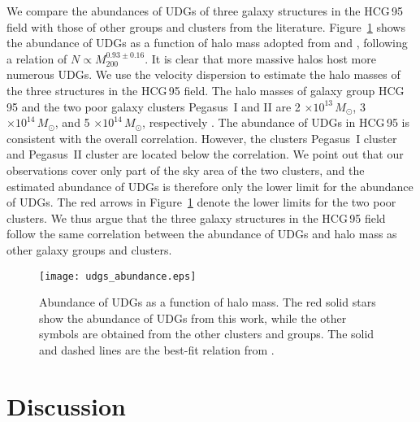 \documentclass[twocolumn,trackchanges]{aastex61}
\begin{document}
We compare the abundances of UDGs of three galaxy structures in the HCG\,95 field with those of other groups and clusters from the literature. Figure~\ref{fig:fig10} shows the abundance of UDGs as a function of halo mass adopted from \cite{Janssens2017} and \cite{vanderBurg2016}, following a relation of $ N \propto M^{0.93\pm0.16}_{200}$. It is clear that more massive halos host more numerous UDGs. We use the velocity dispersion to estimate the halo masses of the three structures in the HCG\,95 field. The halo masses of galaxy group HCG\,95 and the two poor galaxy clusters Pegasus~I and II are 2 $\times 10^{13}\,M_{\odot}$, 3 $\times 10^{14}\,M_{\odot}$, and 5 $\times 10^{14}\,M_{\odot}$, respectively \citep{Chincarini1976,Girardi1998,Barnes1999,Randall2009,Valtchanov1999,DaRocha2005}. The abundance of UDGs in HCG\,95 is consistent with the overall correlation. However, the clusters Pegasus~I cluster and Pegasus~II cluster are located below the correlation. We point out that our observations cover only part of the sky area of the two clusters, and the estimated abundance of UDGs is therefore only the lower limit for the abundance of UDGs. The red arrows in Figure~\ref{fig:fig10} denote the lower limits for the two poor clusters. We thus argue that the three galaxy structures in the HCG\,95 field follow the same correlation between the abundance of UDGs and halo mass as other galaxy groups and clusters.

\begin{figure}
\setlength{\abovecaptionskip}{-2pt}
\begin{center}
\texttt{[image: udgs\_abundance.eps]}
\caption{Abundance of UDGs as a function of halo mass. The red solid stars show the abundance of UDGs from this work, while the other symbols are obtained from the other clusters and groups. The solid and dashed lines are the best-fit relation from \cite{Janssens2017}.}
\label{fig:fig10}
\end{center}
\end{figure}

\section{Discussion} \label{sec:discussion}
\end{document}
